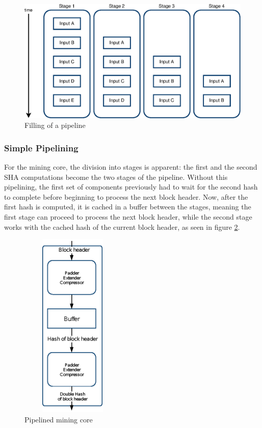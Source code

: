 \begin{figure}
	\centering
	\includegraphics[width=\textwidth]{img/Pipelining.eps}
	\caption[Filling of a pipeline]{Filling of a pipeline}
	\label{fig:pipelining}
\end{figure}


\subsubsection{Simple Pipelining}
\label{pipelining}

For the mining core, the division into stages is apparent: the first and the second SHA computations become the two stages of the pipeline. Without this pipelining, the first set of components previously had to wait for the second hash to complete before beginning to process the next block header. Now, after the first hash is computed, it is cached in a buffer between the stages, meaning the first stage can proceed to process the next block header, while the second stage works with the cached hash of the current block header, as seen in figure \ref{fig:mining-core-pipeline}.

\begin{figure}
	\centering
	\includegraphics[width=5cm, height=9cm, keepaspectratio]{img/Mining-core-pipeline.eps}
	\caption[Pipelined mining core]{Pipelined mining core}
	\label{fig:mining-core-pipeline}
\end{figure}

